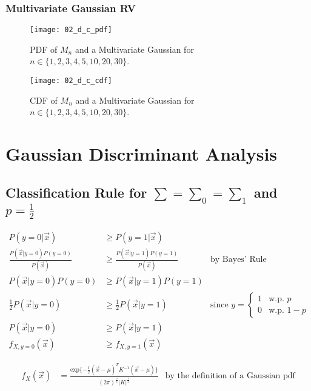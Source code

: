 \documentclass[12pt, a4paper, titlepage, fleqn]{article}
\begin{document}
\subsubsection{Multivariate Gaussian RV}

\begin{figure}[h!]
	\centering
	\texttt{[image: 02\_d\_c\_pdf]}
	\caption{PDF of $M_n$ and a Multivariate Gaussian for $n \in \{1,2,3,4,5,10,20,30\}$.} 
	\label{fig:biased gaussian pdf}
\end{figure}

\pagebreak

\begin{figure}[h!]
	\centering
	\texttt{[image: 02\_d\_c\_cdf]}
	\caption{CDF of $M_n$ and a Multivariate Gaussian for $n \in \{1,2,3,4,5,10,20,30\}$.}
	\label{fig:biased gaussian cdf}
\end{figure}

\pagebreak 

\section{Gaussian Discriminant Analysis}

\subsection{Classification Rule for $\sum = \sum_0 = \sum_1$ and $p=\frac{1}{2}$}

\begin{align}
	P(y=0|\vec{x}) & \geq P(y=1|\vec{x})
	\\
	\frac{P(\vec{x}|y=0)P(y=0)}{P(\vec{x})} & \geq \frac{P(\vec{x}|y=1)P(y=1)}{P(\vec{x})} & \text{by Bayes' Rule}
	\\
	P(\vec{x}|y=0)P(y=0) & \geq P(\vec{x}|y=1)P(y=1)
	\\
	\frac{1}{2}P(\vec{x}|y=0) & \geq \frac{1}{2}P(\vec{x}|y=1) & \text{since }
	y=
		\begin{cases}
			1	& \text{w.p. } p
			\\
			0	& \text{w.p. } 1-p
		\end{cases}
	\\
	P(\vec{x}|y=0) & \geq P(\vec{x}|y=1)
	\\
	f_{X,y=0}(\vec{x}) & \geq f_{X,y=1}(\vec{x})
\end{align}

\begin{align}
	f_{X}(\vec{x}) &= \frac{\text{exp}\{-\frac{1}{2}(\vec{x}-\mu)^T K^{-1}(\vec{x}-\mu)\}}{(2\pi)^{\frac{n}{2}}|K|^\frac{1}{2}}
	& \text{by the definition of a Gaussian pdf} 
\end{align}
\end{document}
